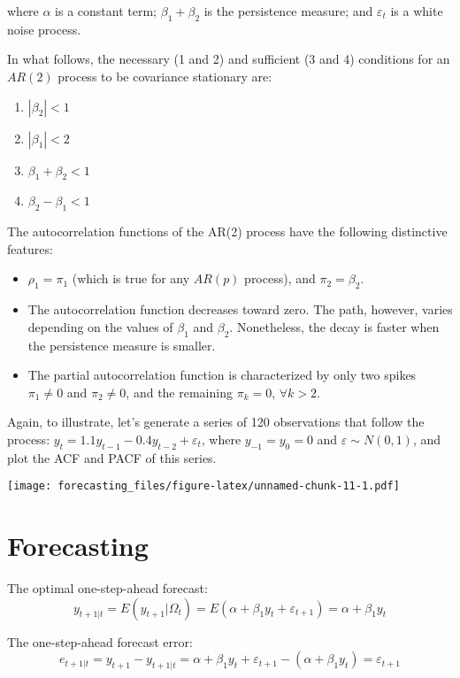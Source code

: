 \documentclass[
  oneside]{book}
\providecommand{\tightlist}{%
  \setlength{\itemsep}{0pt}\setlength{\parskip}{0pt}}
\begin{document}
where \(\alpha\) is a constant term; \(\beta_1+\beta_2\) is the persistence measure; and \(\varepsilon_t\) is a white noise process.

In what follows, the necessary (1 and 2) and sufficient (3 and 4) conditions for an \(AR(2)\) process to be covariance stationary are:

\begin{enumerate}
\def\labelenumi{\arabic{enumi}.}
\tightlist
\item
  \(|\beta_2| < 1\)
\item
  \(|\beta_1| < 2\)
\item
  \(\beta_1 + \beta_2 < 1\)
\item
  \(\beta_2 - \beta_1 < 1\)
\end{enumerate}

The autocorrelation functions of the AR(2) process have the following distinctive features:

\begin{itemize}
\tightlist
\item
  \(\rho_1 = \pi_1\) (which is true for any \(AR(p)\) process), and \(\pi_2 = \beta_2\).
\item
  The autocorrelation function decreases toward zero. The path, however, varies depending on the values of \(\beta_1\) and \(\beta_2\). Nonetheless, the decay is faster when the persistence measure is smaller.
\item
  The partial autocorrelation function is characterized by only two spikes \(\pi_1 \neq 0\) and \(\pi_2 \neq 0\), and the remaining \(\pi_k = 0\), \(\forall k > 2\).
\end{itemize}

Again, to illustrate, let's generate a series of 120 observations that follow the process: \(y_t=1.1y_{t-1}-0.4y_{t-2}+\varepsilon_t\), where \(y_{-1}=y_0=0\) and \(\varepsilon\sim N(0,1)\), and plot the ACF and PACF of this series.

\texttt{[image: forecasting\_files/figure-latex/unnamed-chunk-11-1.pdf]}

\hypertarget{forecasting-2}{%
\section{Forecasting}\label{forecasting-2}}

The optimal one-step-ahead forecast: \[y_{t+1|t} = E(y_{t+1}|\Omega_t) = E(\alpha + \beta_1 y_{t} + \varepsilon_{t+1}) = \alpha + \beta_1 y_{t}\]

The one-step-ahead forecast error: \[e_{t+1|t} = y_{t+1} - y_{t+1|t} = \alpha + \beta_1 y_t + \varepsilon_{t+1} - (\alpha + \beta_1 y_t) = \varepsilon_{t+1}\]
\end{document}
